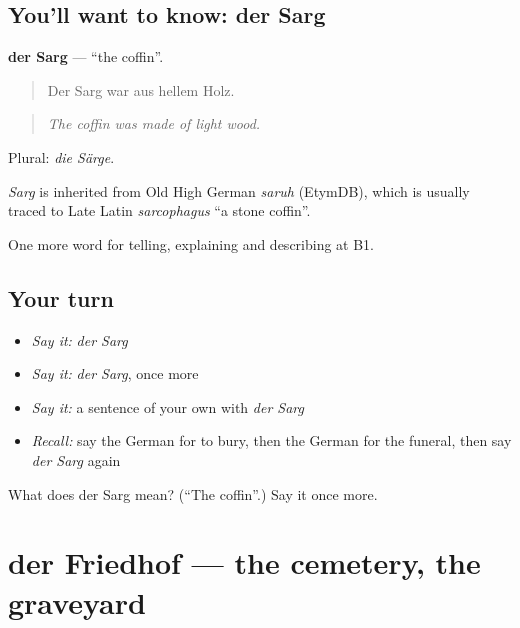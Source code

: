 \subsection*{You'll want to know: der Sarg}
\textbf{der Sarg} — \textquotedblleft{}the coffin\textquotedblright{}.

\begin{quote}
Der Sarg war aus hellem Holz.
\end{quote}

\begin{quote}
\emph{The coffin was made of light wood.}
\end{quote}

Plural: \emph{die Särge}.

\begin{cousinweb}
\emph{Sarg} is inherited from Old High German \emph{saruh} (EtymDB), which is usually traced to Late Latin \emph{sarcophagus} \textquotedblleft{}a stone coffin\textquotedblright{}.
\end{cousinweb}

\begin{grammarlens}[title={What you've built}]
One more word for telling, explaining and describing at B1.
\end{grammarlens}

\subsection*{Your turn}
\begin{itemize}
\raggedright
  \item \emph{Say it:} \emph{der Sarg}
  \item \emph{Say it:} \emph{der Sarg}, once more
  \item \emph{Say it:} a sentence of your own with \emph{der Sarg}
  \item \emph{Recall:} say the German for to bury, then the German for the funeral, then say \emph{der Sarg} again
\end{itemize}

\begin{tcolorbox}[breakable,colback=teal!4,colframe=teal!35!black,title={Before you move on}]
What does der Sarg mean? (\textquotedblleft{}The coffin\textquotedblright{}.) Say it once more.
\end{tcolorbox}
\section[der Friedhof]{der Friedhof — the cemetery, the graveyard}

